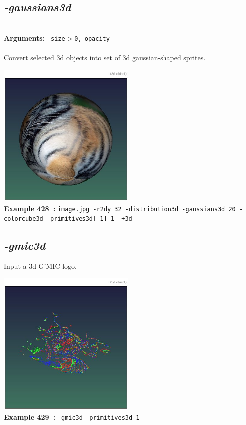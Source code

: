 \documentclass[a4paper,11pt,twoside]{book}
\begin{document}
\subsection{\emph{-gaussians3d} }\vspace*{-0.5em}
~\\\textbf{Arguments: } 
{\small \texttt{\_size$>$0,\_opacity}}\\~\\
Convert selected 3d objects into set of 3d gaussian-shaped sprites.
\begin{center}\includegraphics[keepaspectratio=true,height=7cm,width=\textwidth]{img/gmic_def428.jpg}\\
{\footnotesize \textbf{Example 428~:} \texttt{image.jpg -r2dy 32 -distribution3d -gaussians3d 20 -colorcube3d -primitives3d[-1] 1 -+3d}}
\end{center}

\subsection{\emph{-gmic3d} }\vspace*{-0.5em}
Input a 3d G'MIC logo.
\begin{center}\includegraphics[keepaspectratio=true,height=7cm,width=\textwidth]{img/gmic_def429.jpg}\\
{\footnotesize \textbf{Example 429~:} \texttt{-gmic3d --primitives3d 1}}
\end{center}
\end{document}
